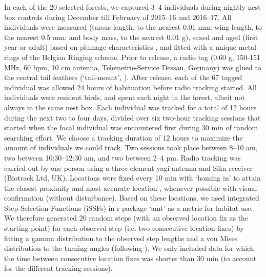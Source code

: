 \documentclass[10pt, twoside]{book} %
\begin{document}
In each of the 20 selected forests, we captured 3--4 individuals during nightly nest box controls during December till February of 2015--16 and 2016--17. All individuals were measured (tarsus length, to the nearest 0.01 mm; wing length, to the nearest 0.5 mm; and body mass, to the nearest 0.01 g), sexed and aged (first year or adult) based on plumage characteristics \citep{Svensson1992}, and fitted with a unique metal rings of the Belgian Ringing scheme. Prior to release, a radio tag (0.60 g, 150-151 MHz, 60 bpm, 10 cm antenna, Telemetrie-Service Dessau, Germany) was glued to the central tail feathers (`tail-mount', \citealt{Kenward2000}). After release, each of the 67 tagged individual was allowed 24 hours of habituation before radio tracking started. All individuals were resident birds, and spent each night in the forest, albeit not always in the same nest box. Each individual was tracked for a total of 12 hours during the next two to four days, divided over six two-hour tracking sessions that started when the focal individual was encountered first during 30 min of random searching effort. We choose a tracking duration of 12 hours to maximize the amount of individuals we could track. Two sessions took place between 8--10 am, two between 10:30--12:30 am, and two between 2--4 pm. Radio tracking was carried out by one person using a three-element yagi-antenna and Sika receiver (Biotrack Ltd, UK). Locations were fixed every 10 min with `homing in' to attain the closest proximity and most accurate location \citep{Kenward2000}, whenever possible with visual confirmation (without disturbance). Based on these locations, we used integrated Step-Selection Functions (iSSFs) in r package `amt' \citep{Signer2019} as a metric for habitat use. We therefore generated 20 random steps (with an observed location fix as the starting point) for each observed step (i.e. two consecutive location fixes) by fitting a gamma distribution to the observed step lengths and a von Mises distribution to the turning angles (following \citealt{Signer2019}). We only included data for which the time between consecutive location fixes was shorter than 30 min (to account for the different tracking sessions).\\
\end{document}
